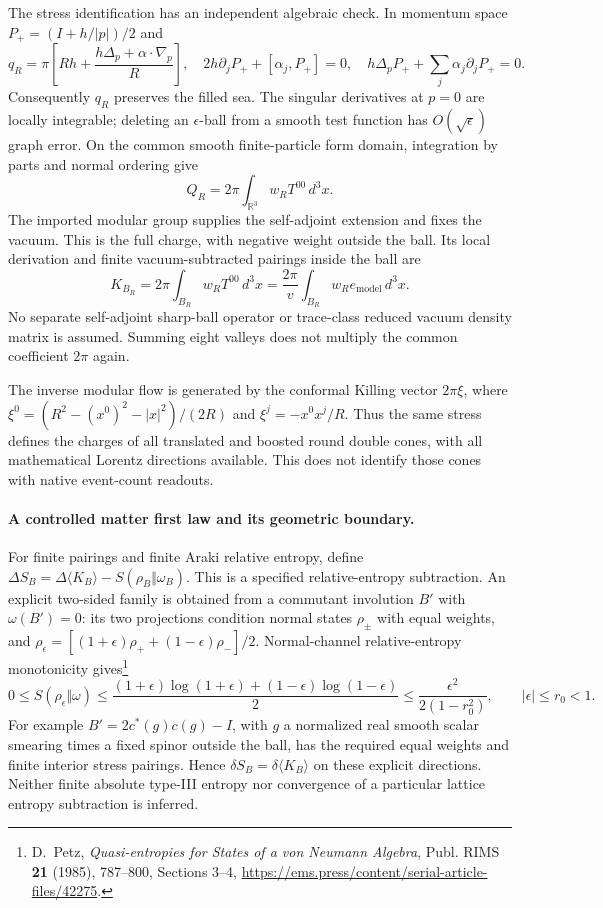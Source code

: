 The stress identification has an independent algebraic check. In momentum
space $P_+=(I+h/|p|)/2$ and
\[
 q_R=\pi\left[Rh+\frac{h\Delta_p+\alpha\cdot\nabla_p}{R}\right],
 \quad 2h\partial_jP_+ +[\alpha_j,P_+]=0,
 \quad h\Delta_pP_+ +\sum_j\alpha_j\partial_jP_+=0.
\]
Consequently $q_R$ preserves the filled sea. The singular derivatives at
$p=0$ are locally integrable; deleting an $\epsilon$-ball from a smooth
test function has $O(\sqrt\epsilon)$ graph error. On the common smooth
finite-particle form domain, integration by parts and normal ordering give
\[
 Q_R=2\pi\int_{\mathbb R^3}w_R T^{00}\,d^3x.
\]
The imported modular group supplies the self-adjoint extension and fixes
the vacuum. This is the full charge, with negative weight outside the
ball. Its local derivation and finite vacuum-subtracted pairings inside
the ball are
\[
 K_{B_R}=2\pi\int_{B_R}w_R T^{00}\,d^3x
        =\frac{2\pi}{v}\int_{B_R}w_R e_{\mathrm{model}}\,d^3x.
\]
No separate self-adjoint sharp-ball operator or trace-class reduced
vacuum density matrix is assumed. Summing eight valleys does not multiply
the common coefficient $2\pi$ again.

The inverse modular flow is generated by the conformal Killing vector
$2\pi\xi$, where
$\xi^0=(R^2-(x^0)^2-|x|^2)/(2R)$ and $\xi^j=-x^0x^j/R$.
Thus the same stress defines the charges of all translated and boosted
round double cones, with all mathematical Lorentz directions available.
This does not identify those cones with native event-count readouts.

\paragraph{A controlled matter first law and its geometric boundary.}
For finite pairings and finite Araki relative entropy, define
$\Delta S_B=\Delta\langle K_B\rangle-S(\rho_B\Vert\omega_B)$.
This is a specified relative-entropy subtraction. An explicit two-sided
family is obtained from a commutant involution $B'$ with $\omega(B')=0$:
its two projections condition normal states $\rho_\pm$ with equal weights,
and $\rho_\epsilon=[(1+\epsilon)\rho_++(1-\epsilon)\rho_-]/2$.
Normal-channel relative-entropy monotonicity gives\footnote{D.~Petz,
\emph{Quasi-entropies for States of a von Neumann Algebra}, Publ. RIMS
\textbf{21} (1985), 787--800, Sections 3--4,
\url{https://ems.press/content/serial-article-files/42275}.}
\[
 0\leq S(\rho_\epsilon\Vert\omega)
 \leq\frac{(1+\epsilon)\log(1+\epsilon)
                +(1-\epsilon)\log(1-\epsilon)}2
 \leq\frac{\epsilon^2}{2(1-r_0^2)},\qquad
 |\epsilon|\leq r_0<1.
\]
For example $B'=2c^*(g)c(g)-I$, with $g$ a normalized real smooth scalar
smearing times a fixed spinor outside the ball, has the required equal
weights and finite interior stress pairings. Hence
$\delta S_B=\delta\langle K_B\rangle$ on these explicit directions.
Neither finite absolute type-III entropy nor convergence of a particular
lattice entropy subtraction is inferred.

